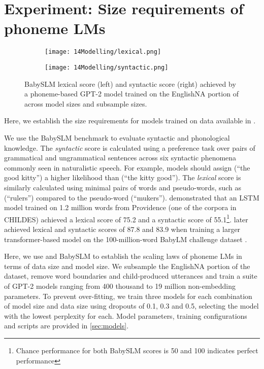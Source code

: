 \section{Experiment: Size requirements of phoneme LMs}\label{sec:14-sizerequirements}

\begin{figure*}[t]
    \centering
    \begin{subfigure}{0.45\linewidth}
        \texttt{[image: 14Modelling/lexical.png]}
    \end{subfigure}
    \hfill
    \begin{subfigure}{0.45\linewidth}
        \texttt{[image: 14Modelling/syntactic.png]}
    \end{subfigure}
    \hfill
    \caption{BabySLM lexical score (left) and syntactic score (right) achieved by a phoneme-based GPT-2 model trained on the EnglishNA portion of \ipachildes across model sizes and subsample sizes.}
    \label{fig:babyslm}
\end{figure*}

Here, we establish the size requirements for models trained on data available in \ipachildes.

We use the BabySLM benchmark \citep{lavechin} to evaluate syntactic and phonological knowledge. The \emph{syntactic} score is calculated using a preference task over pairs of grammatical and ungrammatical sentences across six syntactic phenomena commonly seen in naturalistic speech. For example, models should assign \texttt{} (``the good kitty'') a higher likelihood than \texttt{} (``the kitty good''). The \emph{lexical} score is similarly calculated using minimal pairs of words and pseudo-words, such as \texttt{} (``rulers'') compared to the pseudo-word \texttt{} (``mukers''). \citet{lavechin} demonstrated that an LSTM model trained on 1.2 million words from Providence (one of the corpora in CHILDES) achieved a lexical score of 75.2 and a syntactic score of 55.1\footnote{Chance performance for both BabySLM scores is 50 and 100 indicates perfect performance}. \citet{goriely2024babble} later achieved lexical and syntactic scores of 87.8 and 83.9 when training a larger transformer-based model on the 100-million-word BabyLM challenge dataset \citep{conll-2024-babylm}.

Here, we use \ipachildes and BabySLM to establish the scaling laws of phoneme LMs in terms of data size and model size. We subsample the EnglishNA portion of the dataset, remove word boundaries and child-produced utterances and train a suite of GPT-2 models ranging from 400 thousand to 19 million non-embedding parameters. To prevent over-fitting, we train three models for each combination of model size and data size using dropouts of 0.1, 0.3 and 0.5, selecting the model with the lowest perplexity for each. Model parameters, training configurations and scripts are provided in \cref{sec:models}.

